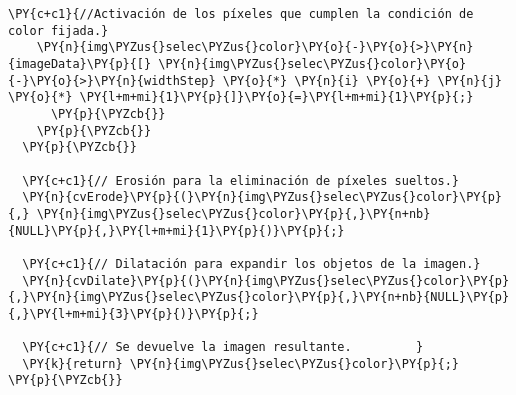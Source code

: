 \begin{Verbatim}[commandchars=\\\{\}]
        \PY{c+c1}{//Activación de los píxeles que cumplen la condición de color fijada.}
	\PY{n}{img\PYZus{}selec\PYZus{}color}\PY{o}{-}\PY{o}{>}\PY{n}{imageData}\PY{p}{[} \PY{n}{img\PYZus{}selec\PYZus{}color}\PY{o}{-}\PY{o}{>}\PY{n}{widthStep} \PY{o}{*} \PY{n}{i} \PY{o}{+} \PY{n}{j} \PY{o}{*} \PY{l+m+mi}{1}\PY{p}{]}\PY{o}{=}\PY{l+m+mi}{1}\PY{p}{;}
      \PY{p}{\PYZcb{}}
    \PY{p}{\PYZcb{}}
  \PY{p}{\PYZcb{}}
  
  \PY{c+c1}{// Erosión para la eliminación de píxeles sueltos.}
  \PY{n}{cvErode}\PY{p}{(}\PY{n}{img\PYZus{}selec\PYZus{}color}\PY{p}{,} \PY{n}{img\PYZus{}selec\PYZus{}color}\PY{p}{,}\PY{n+nb}{NULL}\PY{p}{,}\PY{l+m+mi}{1}\PY{p}{)}\PY{p}{;}
  
  \PY{c+c1}{// Dilatación para expandir los objetos de la imagen.}
  \PY{n}{cvDilate}\PY{p}{(}\PY{n}{img\PYZus{}selec\PYZus{}color}\PY{p}{,}\PY{n}{img\PYZus{}selec\PYZus{}color}\PY{p}{,}\PY{n+nb}{NULL}\PY{p}{,}\PY{l+m+mi}{3}\PY{p}{)}\PY{p}{;}

  \PY{c+c1}{// Se devuelve la imagen resultante.	     }
  \PY{k}{return} \PY{n}{img\PYZus{}selec\PYZus{}color}\PY{p}{;}
\PY{p}{\PYZcb{}}
\end{Verbatim}
